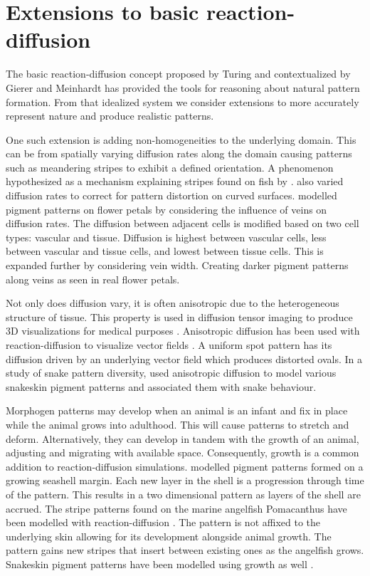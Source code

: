 \section{Extensions to basic reaction-diffusion}

The basic reaction-diffusion concept proposed by Turing and contextualized by Gierer and Meinhardt has provided the tools for reasoning about natural pattern formation. From that idealized system we consider extensions to more accurately represent nature and produce realistic patterns.

One such extension is adding non-homogeneities to the underlying domain. This can be from spatially varying diffusion rates along the domain causing patterns such as meandering stripes to exhibit a defined orientation. A phenomenon hypothesized as a mechanism explaining stripes found on fish by \citet{zheng2009}. \citet{Witkin1991} also varied diffusion rates to correct for pattern distortion on curved surfaces. \citet{Zhou2007} modelled pigment patterns on flower petals by considering the influence of veins on diffusion rates. The diffusion between adjacent cells is modified based on two cell types: vascular and tissue. Diffusion is highest between vascular cells, less between vascular and tissue cells, and lowest between tissue cells. This is expanded further by considering vein width. Creating darker pigment patterns along veins as seen in real flower petals.

Not only does diffusion vary, it is often anisotropic due to the heterogeneous structure of tissue. This property is used in diffusion tensor imaging to produce 3D visualizations for medical purposes \citep{Bihan2001}. Anisotropic diffusion has been used with reaction-diffusion to visualize vector fields \citep{Sanderson2004}. A uniform spot pattern has its diffusion driven by an underlying vector field which produces distorted ovals. In a study of snake pattern diversity, \citet{Allen2013} used anisotropic diffusion to model various snakeskin pigment patterns and associated them with snake behaviour.

Morphogen patterns may develop when an animal is an infant and fix in place while the animal grows into adulthood. This will cause patterns to stretch and deform. Alternatively, they can develop in tandem with the growth of an animal, adjusting and migrating with available space. Consequently, growth is a common addition to reaction-diffusion simulations. \citet{fowler1992modeling} modelled pigment patterns formed on a growing seashell margin. Each new layer in the shell is a progression through time of the pattern. This results in a two dimensional pattern as layers of the shell are accrued. The stripe patterns found on the marine angelfish Pomacanthus have been modelled with reaction-diffusion \citep{Kondo1995}. The pattern is not affixed to the underlying skin allowing for its development alongside animal growth. The pattern gains new stripes that insert between existing ones as the angelfish grows. Snakeskin pigment patterns have been modelled using growth as well \citep{MURRAY1991}.

